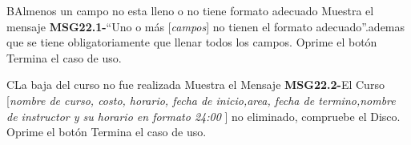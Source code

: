 		\begin{UCtrayectoriaA}{B}{Almenos un campo no esta lleno o no tiene formato adecuado}
			\UCpaso Muestra el mensaje {\bf MSG22.1-}``Uno o más [{\em campos}] no tienen el formato adecuado''.ademas que se tiene obligatoriamente que llenar todos los campos.
			\UCpaso[\UCactor] Oprime el botón 
			\UCpaso[] Termina el caso de uso.
		\end{UCtrayectoriaA}
		
		\begin{UCtrayectoriaA}{C}{La baja del curso no fue realizada }
			\UCpaso Muestra el Mensaje {\bf MSG22.2-}El Curso [{\em nombre de curso, costo, horario, fecha de inicio,area, fecha de termino,nombre de instructor y su  horario en formato 24:00 }] no eliminado, compruebe el Disco.
			\UCpaso[\UCactor] Oprime el botón 
			\UCpaso[] Termina el caso de uso.
		\end{UCtrayectoriaA}	
